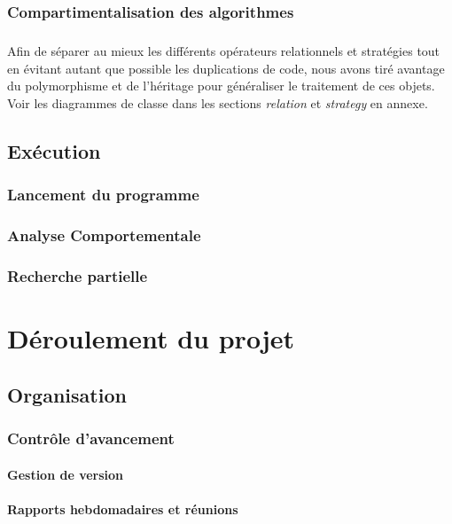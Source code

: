\documentclass[a4paper,10pt]{report}
\begin{document}
\subsection{Compartimentalisation des algorithmes}
\paragraph{}
  Afin de séparer au mieux les différents opérateurs relationnels et stratégies tout en évitant autant
que possible les duplications de code, nous avons tiré avantage du polymorphisme et de l'héritage pour
généraliser le traitement de ces objets. Voir les diagrammes de classe dans les sections \textit{relation}
et \textit{strategy} en annexe.


\section{Exécution}
\subsection{Lancement du programme}

\subsection{Analyse Comportementale}

\subsection{Recherche partielle}


\chapter{Déroulement du projet}
\section{Organisation}
\subsection{Contrôle d'avancement}

\subsubsection{Gestion de version}

\subsubsection{Rapports hebdomadaires et réunions}
\end{document}
